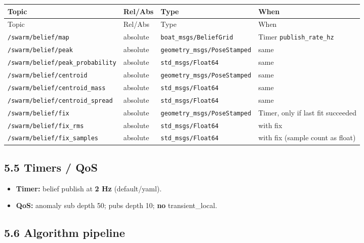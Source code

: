 \begin{center}
\small
\begin{longtable}{@{}lllp{5.2cm}@{}}
\toprule
Topic & Rel/Abs & Type & When \\
\midrule
\endfirsthead
\toprule
Topic & Rel/Abs & Type & When \\
\midrule
\endhead
\texttt{/swarm/belief/map} & absolute & \texttt{boat\_msgs/BeliefGrid} & Timer \texttt{publish\_rate\_hz} \\
\texttt{/swarm/belief/peak} & absolute & \texttt{geometry\_msgs/PoseStamped} & same \\
\texttt{/swarm/belief/peak\_probability} & absolute & \texttt{std\_msgs/Float64} & same \\
\texttt{/swarm/belief/centroid} & absolute & \texttt{geometry\_msgs/PoseStamped} & same \\
\texttt{/swarm/belief/centroid\_mass} & absolute & \texttt{std\_msgs/Float64} & same \\
\texttt{/swarm/belief/centroid\_spread} & absolute & \texttt{std\_msgs/Float64} & same \\
\texttt{/swarm/belief/fix} & absolute & \texttt{geometry\_msgs/PoseStamped} & Timer, only if last fit succeeded \\
\texttt{/swarm/belief/fix\_rms} & absolute & \texttt{std\_msgs/Float64} & with fix \\
\texttt{/swarm/belief/fix\_samples} & absolute & \texttt{std\_msgs/Float64} & with fix (sample count as float) \\
\bottomrule
\end{longtable}
\end{center}


\subsection{5.5 Timers / QoS}


\begin{itemize}[leftmargin=*]
\item \textbf{Timer:} belief publish at \textbf{2 Hz} (default/yaml).
\item \textbf{QoS:} anomaly sub depth 50; pubs depth 10; \textbf{no} transient\_local.
\end{itemize}


\subsection{5.6 Algorithm pipeline}


